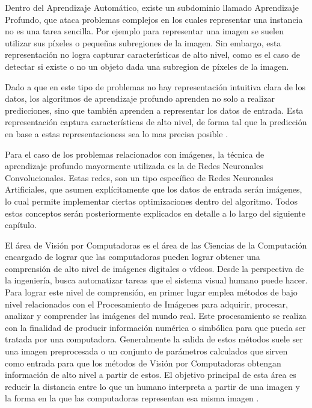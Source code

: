 \documentclass[a4paper,11pt,spanish]{book}
\begin{document}
    Dentro del Aprendizaje Automático, existe un subdominio llamado Aprendizaje Profundo, que ataca problemas complejos en los cuales representar una instancia 
    no es una tarea sencilla.
    Por ejemplo para representar una imagen se suelen utilizar sus píxeles o pequeñas subregiones de la imagen. Sin embargo, esta representación no logra capturar 
    características de alto nivel, como es el caso de detectar si existe o no un objeto dada una subregion de píxeles de la imagen.

    Dado a que en este tipo de problemas no hay representación intuitiva clara de los datos, los algoritmos de aprendizaje profundo aprenden no solo a realizar predicciones, 
    sino que también aprenden a representar los datos de entrada. 
    Esta representación captura características de alto nivel, de forma tal que la predicción en base a estas representacioness sea lo mas precisa posible \cite{Goodfellow-et-al-2016}.

    Para el caso de los problemas relacionados con imágenes, la técnica de aprendizaje profundo mayormente utilizada es la de Redes Neuronales Convolucionales.
    Estas redes, son un tipo específico de Redes Neuronales Artificiales, que asumen explícitamente que los datos de entrada serán imágenes, lo cual permite implementar
    ciertas optimizaciones dentro del algoritmo. Todos estos conceptos serán posteriormente explicados en detalle a lo largo del siguiente capítulo.

    El área de Visión por Computadoras es el área de las Ciencias de la Computación encargado de lograr que las computadoras pueden lograr obtener una comprensión de alto 
    nivel de imágenes digitales o vídeos.
    Desde la perspectiva de la ingeniería, busca automatizar tareas que el sistema visual humano puede hacer. 
    Para lograr este nivel de comprensión, en primer lugar emplea métodos de bajo nivel relacionados con el Procesamiento de Imágenes para adquirir, procesar, analizar 
    y comprender las imágenes del mundo real. 
    Este procesamiento se realiza con la finalidad de producir información numérica o simbólica para que pueda ser tratada por una computadora. 
    Generalmente la salida de estos métodos suele ser una imagen preprocesada o un conjunto de parámetros calculados que sirven como entrada
    para que los métodos de Visión por Computadoras obtengan información de alto nivel a partir de estos.
    El objetivo principal de esta área es reducir la distancia entre lo que un humano interpreta a partir de una imagen y la forma en la que las computadoras 
    representan esa misma imagen \cite{Szeliski:ComputerVision}.
\end{document}
